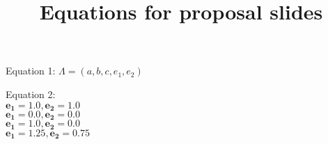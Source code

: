 \documentclass{article}
\title{Equations for proposal slides}
\begin{document}
\maketitle

Equation 1: $ \Lambda = ( a, b, c, e_{1}, e_{2} ) $

Equation 2:
\\

$\bm{e_{1}=1.0, e_{2}=1.0}$
\\

$\bm{e_{1}=0.0, e_{2}=0.0}$
\\

$\bm{e_{1}=1.0, e_{2}=0.0}$
\\

$\bm{e_{1}=1.25, e_{2}=0.75}$
\end{document}

